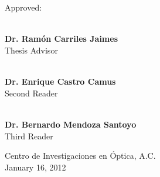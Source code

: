 \begin{center}
\vspace{2cm}
\\
\vspace{0.7cm}
\vspace{0.7cm}
\\
\end{center}
\vfill
{\Large Approved:}
\begin{flushright}
\makebox[0.5\textwidth ]{\hrulefill}\\
\textbf{Dr. Ram\'on Carriles Jaimes}\\ Thesis Advisor
\vspace{1.25cm}

\makebox[0.5\textwidth ]{\hrulefill}\\
\textbf{Dr. Enrique Castro Camus}\\ Second Reader
\vspace{1.25cm}

\makebox[0.5\textwidth ]{\hrulefill}\\
\textbf{Dr. Bernardo Mendoza Santoyo}\\Third Reader
\vfill

\begin{center}
\large {Centro de Investigaciones en \'Optica, A.C.\\
January 16, 2012}
\end{center}
\end{flushright}
